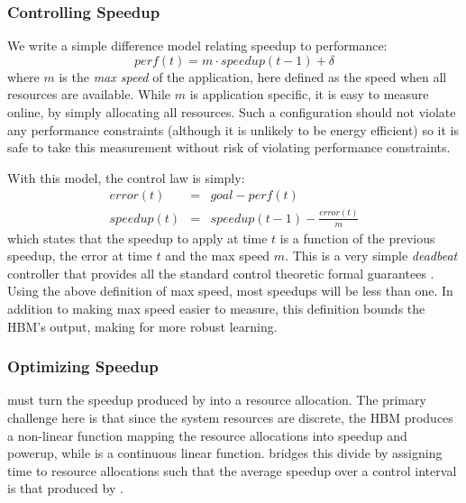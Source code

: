 \subsubsection{Controlling Speedup}
We write a simple difference model relating speedup to performance:
\begin{equation}
  perf(t) = m \cdot speedup(t-1) + \delta \label{eqn:speedup}
\end{equation}
where $m$ is the \emph{max speed} of the application, here defined as
the speed when all resources are available.  While $m$ is application
specific, it is easy to measure online, by simply allocating all
resources. Such a configuration should not violate any performance
constraints (although it is unlikely to be energy efficient) so it is
safe to take this measurement without risk of violating performance
constraints.

With this model, the control law is simply:
\begin{eqnarray}
  error(t) &=& goal - perf(t) \label{eqn:speedup-error} \\
  speedup(t) &=& speedup(t-1) - \frac{error(t)}{m}
  \label{eqn:speedup-control}
\end{eqnarray}
which states that the speedup to apply at time $t$ is a function of
the previous speedup, the error at time $t$ and the max speed $m$.
This is a very simple \emph{deadbeat} controller that provides all the
standard control theoretic formal guarantees \cite{Hellerstein2004a}.
Using the above definition of max speed, most speedups will be less
than one.  In addition to making max speed easier to measure, this
definition bounds the HBM's output, making for more robust learning.

\subsubsection{Optimizing Speedup}
\SYSTEM{} must turn the speedup produced by 
into a resource allocation.  The primary challenge here is that since
the system resources are discrete, the HBM produces a non-linear
function mapping the resource allocations into speedup and powerup,
while  is a continuous linear function.
\SYSTEM{} bridges this divide by assigning time to resource
allocations such that the average speedup over a control interval is
that produced by .

